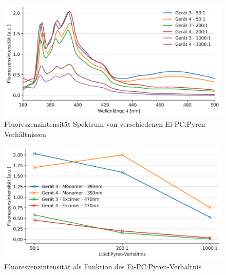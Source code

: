 \begin{figure}[h!]
	\begin{center}
		\begin{minipage}{0,8\textwidth}
			
			\includegraphics[width=\textwidth]{picture/Konz.png}
			\caption{Fluoreszenzintensität Spektrum von verschiedenen Ei-PC:Pyren-Verhältnissen} 
			\label{Konz_Scan} 
		\end{minipage}
	\end{center}
\end{figure}

\begin{figure}[h!]
	\begin{center}
		\begin{minipage}{0,8\textwidth}
			
			\includegraphics[width=\textwidth]{picture/Konz_Verh.png}
			\caption{Fluoreszenzintensität als Funktion des Ei-PC:Pyren-Verhältnis} 
			\label{Konz_Verh} 
		\end{minipage}
	\end{center}
\end{figure}
\vspace*{3.4cm}


